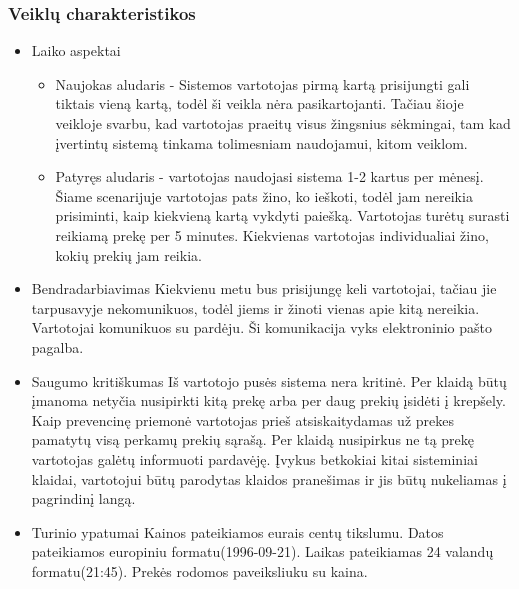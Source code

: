 \documentclass[oneside]{VUMIFPSkursinis}
\begin{document}
		\subsubsection{Veiklų charakteristikos}
				\begin{itemize}
					\item{Laiko aspektai}
								
						\begin{itemize}
								\item{Naujokas aludaris - Sistemos vartotojas pirmą kartą prisijungti gali tiktais vieną kartą, todėl ši veikla nėra pasikartojanti.
						Tačiau šioje veikloje svarbu, kad vartotojas praeitų visus žingsnius sėkmingai, tam kad įvertintų sistemą tinkama tolimesniam naudojamui, kitom veiklom. }
								\item{Patyręs aludaris - vartotojas naudojasi sistema 1-2 kartus per mėnesį.
						Šiame scenarijuje vartotojas pats žino, ko ieškoti, todėl jam nereikia prisiminti, kaip kiekvieną kartą vykdyti paiešką.
						Vartotojas turėtų surasti reikiamą prekę per 5 minutes.
						Kiekvienas vartotojas individualiai žino, kokių prekių jam reikia.}
						\end{itemize}
					\item{Bendradarbiavimas}
						Kiekvienu metu bus prisijungę keli vartotojai, tačiau jie tarpusavyje nekomunikuos, todėl jiems ir žinoti vienas apie kitą nereikia. 
						Vartotojai komunikuos su pardėju. 
						Ši komunikacija vyks elektroninio pašto pagalba.
			
					\item{Saugumo kritiškumas}
						Iš vartotojo pusės sistema nera kritinė.
						Per klaidą būtų įmanoma netyčia nusipirkti kitą prekę arba per daug prekių įsidėti į krepšely.
						Kaip prevencinę priemonė vartotojas prieš atsiskaitydamas už prekes pamatytų visą perkamų prekių sąrašą. 
						Per klaidą nusipirkus ne tą prekę vartotojas galėtų informuoti pardavėję. 
						Įvykus betkokiai kitai sisteminiai klaidai, vartotojui būtų parodytas klaidos pranešimas ir jis būtų nukeliamas į pagrindinį langą.
					\item{Turinio ypatumai}
						Kainos pateikiamos eurais centų tikslumu.
						Datos pateikiamos europiniu formatu(1996-09-21).
						Laikas pateikiamas 24 valandų formatu(21:45).
						Prekės rodomos paveiksliuku su kaina.
						
					
				\end{itemize}
\end{document}
